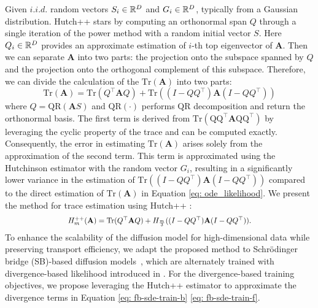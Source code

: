 Given $i.i.d.$ random vectors $S_i \in \mathbb{R}^{D}$ and $G_i \in \mathbb{R}^{D}$, typically from a Gaussian distribution. Hutch++ stars by computing an orthonormal span $Q$ through a single iteration of the power method with a random initial vector $S$.
Here $Q_i \in \mathbb{R}^D$ provides an approximate estimation of $i$-th top eigenvector of $\mathbf{A}$. 
Then we can separate $\mathbf{A}$ into two parts: the projection onto the subspace spanned by $Q$ and the projection onto the orthogonal complement of this subspace. 
Therefore, we can divide the calculation of the $\mathrm{Tr}(\mathbf{A})$ into two parts:
\setcounter{equation}{7}
\begin{equation}\label{eq: trance_separate}
    \mathrm{Tr}(\mathbf{A}) = \mathrm{Tr}(Q^\top\mathbf{A}Q)+ \mathrm{Tr}((I-QQ^\top)\mathbf{A}(I-QQ^\top))
\end{equation}
where $Q = \mathrm{QR}(\mathbf{A}S)$ and $\mathrm{QR}(\cdot)$ performs QR decomposition and return the orthonormal basis.
The first term is derived from $\mathrm{Tr(QQ^\top\mathbf{A}QQ^\top)}$ by leveraging the cyclic property of the trace and can be computed exactly. 
Consequently, the error in estimating $\mathrm{Tr}(\mathbf{A})$ arises solely from the approximation of the second term. This term is approximated using the Hutchinson estimator with the random vector $G_i$, resulting in a significantly lower variance in the estimation of $\mathrm{Tr}((I-QQ^\top)\mathbf{A}(I-QQ^\top))$ compared to the direct estimation of $\mathrm{Tr}(\mathbf{A})$ in Equation \ref{eq: ode_likelihood}.
We present the method for trace estimation using Hutch++ \citep{hutch_pp}:
\begin{equation}
\scalebox{0.87}{$
    H_m^{++}(\mathbf{A})=\mathrm{Tr}(Q^\top\mathbf{A}Q)+H_{\frac{m}{3}}((I-QQ^\top)\mathbf{A}(I-QQ^\top)).$}\label{eqn:hutchpp} 
\end{equation}
To enhance the scalability of the diffusion model for high-dimensional data while preserving transport efficiency, we adapt the proposed method to Schrödinger bridge (SB)-based diffusion models~\citep{forward_backward_SDE, mSB, VSDM}, which are alternately trained with divergence-based likelihood introduced in .
For the divergence-based training objectives, 
we propose leveraging the Hutch++ estimator to approximate the divergence terms in Equation \ref{eq: fb-sde-train-b} \ref{eq: fb-sde-train-f}. 

